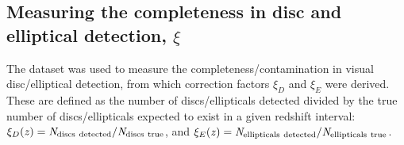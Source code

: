 \documentclass[useAMS,usenatbib]{mn2e}
\begin{document}
\subsection{Measuring the completeness in disc and elliptical detection, $\xi$}
\label{ssec:xi}

The  dataset was used to measure the completeness/contamination in visual disc/elliptical detection, from which correction factors $\xi_D$ and $\xi_E$ were derived. These are defined as the number of discs/ellipticals detected divided by the true number of discs/ellipticals expected to exist in a given redshift interval: $ \xi_D(\it{z})=N_{\rm discs~detected}/N_{\rm discs~true}$, and $\xi_E(\it{z})=N_{\rm ellipticals~detected}/N_{\rm ellipticals~true}$. 



\end{document}
